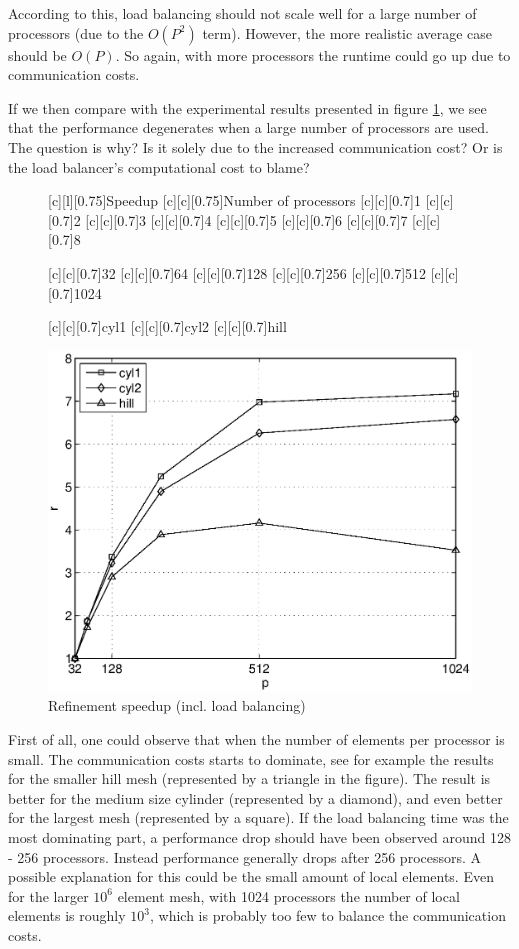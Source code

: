 According to this, load balancing should not scale well for a large
number of processors (due to the $O(P^2)$ term). However, the more
realistic average case should be $O(P)$. So again, with more
processors the runtime could go up due to communication costs.

If we then compare with the experimental results presented in figure
\ref{hoffman-4:fig:refsp}, we see that the performance degenerates when a large
number of processors are used. The question is why? Is it solely due
to the increased communication cost? Or is the load balancer's
computational cost to blame?
\begin{figure}[hbt]
  [c][l][0.75]{Speedup}
  [c][c][0.75]{Number of processors}
  [c][c][0.7]{1}
  [c][c][0.7]{2}
  [c][c][0.7]{3}
  [c][c][0.7]{4}
  [c][c][0.7]{5}
  [c][c][0.7]{6}
  [c][c][0.7]{7}
  [c][c][0.7]{8}

  [c][c][0.7]{32}
  [c][c][0.7]{64}
  [c][c][0.7]{128}
  [c][c][0.7]{256}
  [c][c][0.7]{512}
  [c][c][0.7]{1024}

  [c][c][0.7]{cyl1}
  [c][c][0.7]{cyl2}
  [c][c][0.7]{hill}

  \begin{center}
      \includegraphics[width=0.55\columnwidth]{chapters/hoffman-4/eps/speedup.eps}
      \caption{Refinement speedup (incl. load balancing)}
      \label{hoffman-4:fig:refsp}
  \end{center}
\end{figure}

First of all, one could observe that when the number of elements per
processor is small. The communication costs starts to dominate, see
for example the results for the smaller hill mesh (represented by a
triangle in the figure). The result is better for the medium size
cylinder (represented by a diamond), and even better for the largest
mesh (represented by a square). If the load balancing time was the
most dominating part, a performance drop should have been observed
around 128 - 256 processors. Instead performance generally drops after
256 processors. A possible explanation for this could be the small
amount of local elements. Even for the larger $10^6$ element mesh,
with 1024 processors the number of local elements is roughly $10^3$,
which is probably too few to balance the communication costs.

